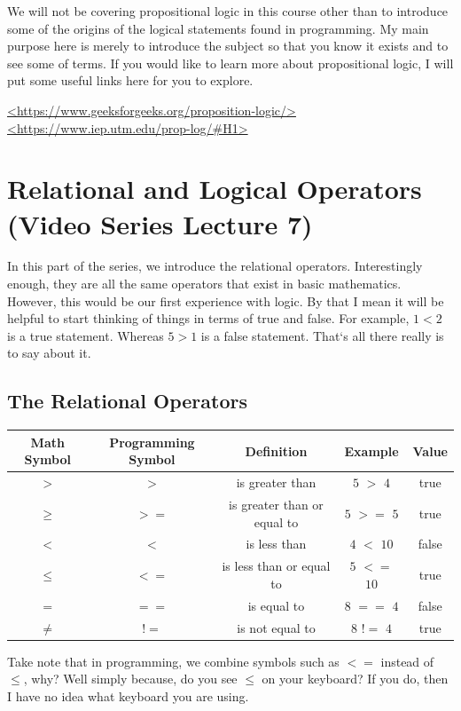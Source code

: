 \documentclass[11]{article}
\begin{document}
We will not be covering propositional logic in this course other than to introduce some of the origins of the logical statements found in programming. My main purpose here is merely to introduce the subject so that you know it exists and to see some of terms. If you would like to learn more about propositional logic, I will put some useful links here for you to explore.

\url{<https://www.geeksforgeeks.org/proposition-logic/>}\\
\url {<https://www.iep.utm.edu/prop-log/#H1>}


\section{Relational and Logical Operators (Video Series Lecture 7)}
In this part of the series, we introduce the relational operators.  Interestingly enough, they are all the same operators that exist in basic mathematics. However, this would be our first experience with logic. By that I mean it will be helpful to start thinking of things in terms of true and false. For example, $1<2$ is a true statement. Whereas $5>1$ is a false statement. That`s all there really is to say about it.
\subsection{The Relational Operators}
\begin{center}
  \begin{tabular}{ | c | c | c | c | c |}
    \hline
    Math Symbol & Programming Symbol & Definition & Example & Value \\ \hline
    $>$ & $>$ & is greater than & $5$ $>$ $4$ & true \\ \hline
    $\geq$ & $>=$ & is greater than or equal to & $5$ $>=$ $5$ & true \\ \hline
    $<$ & $<$ & is less than & $4$ $<$ $10$ & false \\ \hline
    $\leq$ & $<=$ & is less than or equal to & $5$ $<=$ $10$ & true \\ \hline
    $=$ & $==$ & is equal to & $8$ $==$  $4$ & false \\ \hline
    $\neq$ & $!=$ & is not equal to & $8$ $!=$  $4$ & true \\ 
    \hline
  \end{tabular}
\end{center}

Take note that in programming, we combine symbols such as $<=$ instead of $\leq$, why? Well simply because, do you see $\leq$ on your keyboard? If you do, then I have no idea what keyboard you are using. \\
\end{document}
